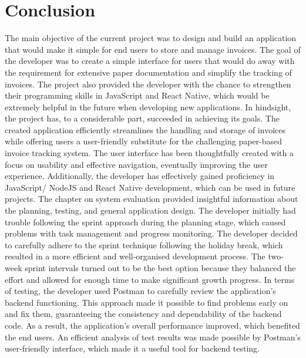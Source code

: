 \chapter{Conclusion} 

The main objective of the current project was to design and build an application that would make it simple for end users to store and manage invoices. The goal of the developer was to create a simple interface for users that would do away with the requirement for extensive paper documentation and simplify the tracking of invoices. The project also provided the developer with the chance to strengthen their programming skills in JavaScript and React Native, which would be extremely helpful in the future when developing new applications. 
\newline \newline
In hindsight, the project has, to a considerable part, succeeded in achieving its goals. The created application efficiently streamlines the handling and storage of invoices while offering users a user-friendly substitute for the challenging paper-based invoice tracking system. The user interface has been thoughtfully created with a focus on usability and effective navigation, eventually improving the user experience. Additionally, the developer has effectively gained proficiency in JavaScript/ NodeJS and React Native development, which can be used in future projects.
\newline \newline
The chapter on system evaluation provided insightful information about the planning, testing, and general application design. The developer initially had trouble following the sprint approach during the planning stage, which caused problems with task management and progress monitoring. The developer decided to carefully adhere to the sprint technique following the holiday break, which resulted in a more efficient and well-organised development process. The two-week sprint intervals turned out to be the best option because they balanced the effort and allowed for enough time to make significant growth progress.
\newline \newline
In terms of testing, the developer used Postman to carefully review the application's backend functioning. This approach made it possible to find problems early on and fix them, guaranteeing the consistency and dependability of the backend code. As a result, the application's overall performance improved, which benefited the end users. An efficient analysis of test results was made possible by Postman's user-friendly interface, which made it a useful tool for backend testing.
